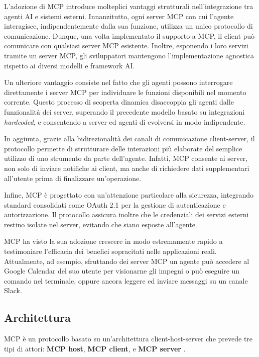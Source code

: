 L'adozione di MCP introduce molteplici vantaggi strutturali
nell'integrazione tra agenti AI e sistemi esterni. Innanzitutto, ogni
server MCP con cui l'agente interagisce, indipendentemente dalla sua
funzione, utilizza un unico protocollo di comunicazione. Dunque, una
volta implementato il supporto a MCP, il client può comunicare con
qualsiasi server MCP esistente. Inoltre, esponendo i
loro servizi tramite un server MCP, gli sviluppatori mantengono l'implementazione
agnostica rispetto ai diversi modelli e framework AI.

Un ulteriore vantaggio consiste nel fatto che gli agenti possono
interrogare direttamente i server MCP per individuare le funzioni
disponibili nel momento corrente. Questo processo di scoperta dinamica
disaccoppia gli agenti dalle funzionalità dei server, superando il
precedente modello basato su integrazioni \emph{hardcoded}, e consentendo a
server ed agenti di evolversi in modo indipendente.

In aggiunta, grazie alla bidirezionalità dei canali di comunicazione
client-server, il protocollo permette di strutturare delle interazioni
più elaborate del semplice utilizzo di uno strumento da parte
dell'agente. Infatti, MCP consente ai server, non solo di inviare
notifiche ai client, ma anche di richiedere dati supplementari
all'utente prima di finalizzare un'operazione.

Infine, MCP è progettato con un'attenzione particolare alla sicurezza,
integrando standard consolidati come OAuth 2.1 per la gestione di
autenticazione e autorizzazione. Il protocollo assicura inoltre che le
credenziali dei servizi esterni restino isolate nel server, evitando che
siano esposte all'agente.

MCP ha visto la sua adozione crescere in modo estremamente rapido a
testimoniare l'efficacia dei benefici sopracitati nelle applicazioni
reali. Attualmente, ad esempio, sfruttando dei server MCP un agente può
accedere al Google Calendar del suo utente per visionarne gli impegni o
può eseguire un comando nel terminale, oppure ancora leggere ed inviare
messaggi su un canale Slack.

\subsection{Architettura}\label{architettura}

MCP è un protocollo basato su un’architettura client-host-server che
prevede tre tipi di attori: \textbf{MCP host}, \textbf{MCP client}, e 
\textbf{MCP server} \autocite{ArchitectureoverviewModelContextProtocol-2026-07-28}.

